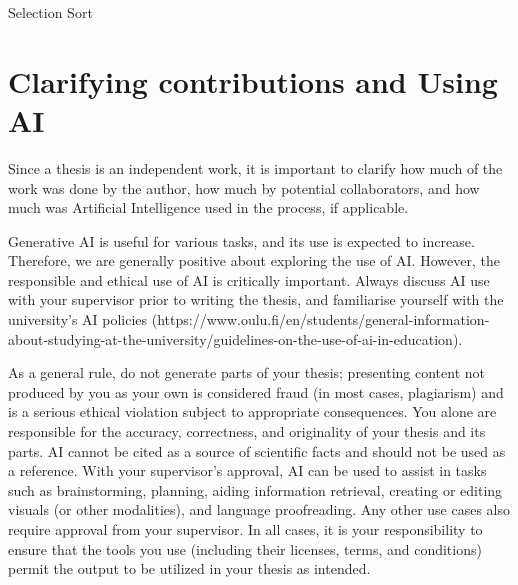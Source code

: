 \vspace{7mm}
\begin{algorithm}[H]
\SetAlgoLined
\DontPrintSemicolon
{}
\caption{Selection Sort}
\label{alg:examplealg}
\end{algorithm}

\section{Clarifying contributions and Using AI}
\label{AI}
Since a thesis is an independent work, it is important to clarify how much of the work was done by the author, how much by potential collaborators, and how much was Artificial Intelligence used in the process, if applicable. 

Generative AI is useful for various tasks, and its use is expected to increase. Therefore, we are generally positive about exploring the use of AI. However, the responsible and ethical use of AI is critically important. Always discuss AI use with your supervisor prior to writing the thesis, and familiarise yourself with the university's AI policies (https://www.oulu.fi/en/students/general-information-about-studying-at-the-university/guidelines-on-the-use-of-ai-in-education).

As a general rule, do not generate parts of your thesis; presenting content not produced by you as your own is considered fraud (in most cases, plagiarism) and is a serious ethical violation subject to appropriate consequences. You alone are responsible for the accuracy, correctness, and originality of your thesis and its parts. AI cannot be cited as a source of scientific facts and should not be used as a reference. With your supervisor's approval, AI can be used to assist in tasks such as brainstorming, planning, aiding information retrieval, creating or editing visuals (or other modalities), and language proofreading. Any other use cases also require approval from your supervisor. In all cases, it is your responsibility to ensure that the tools you use (including their licenses, terms, and conditions) permit the output to be utilized in your thesis as intended.

